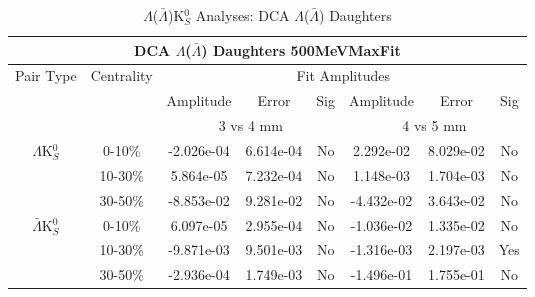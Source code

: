 \documentclass[../AnalysisNoteJBuxton.tex]{subfiles}
\begin{document}
\begin{table}
 \centering
 \begin{tabular}{|c|c|c|c|c||c|c|c|}
  \multicolumn{8}{c}{DCA $\Lambda$($\bar{\Lambda}$) Daughters 500MeVMaxFit} \\
  \hline
  \multirow{3}{*}{Pair Type} & \multirow{3}{*}{Centrality} & \multicolumn{6}{c|}{Fit Amplitudes} \\
  \cline{3-8}
   & & Amplitude & Error & Sig & Amplitude & Error & Sig \\  
  \cline{3-8}
   & & \multicolumn{3}{c||}{3 vs 4 mm} & \multicolumn{3}{c|}{4 vs 5 mm} \\  
  \hline  
  \multirow{3}{*}{$\Lambda$K$^{0}_{S}$}  
   &  0-10\% & -2.026e-04 & 6.614e-04 & No & 2.292e-02 & 8.029e-02 & No \\
   & 10-30\% & 5.864e-05 & 7.232e-04 & No & 1.148e-03 & 1.704e-03 & No \\
   & 30-50\% & -8.853e-02 & 9.281e-02 & No & -4.432e-02 & 3.643e-02 & No \\
  \hline  
  \multirow{3}{*}{$\bar{\Lambda}$K$^{0}_{S}$}  
   &  0-10\% & 6.097e-05 & 2.955e-04 & No & -1.036e-02 & 1.335e-02 & No \\
   & 10-30\% & -9.871e-03 & 9.501e-03 & No & -1.316e-03 & 2.197e-03 & Yes \\
   & 30-50\% & -2.936e-04 & 1.749e-03 & No & -1.496e-01 & 1.755e-01 & No \\
  \hline
 \end{tabular}
 \caption{$\Lambda$($\bar{\Lambda}$)K$^{0}_{S}$ Analyses: DCA $\Lambda$($\bar{\Lambda}$) Daughters}
 \label{tab:LamDaughtersDcaLamK0_500MeVMaxFit}
\end{table}
\end{document}
